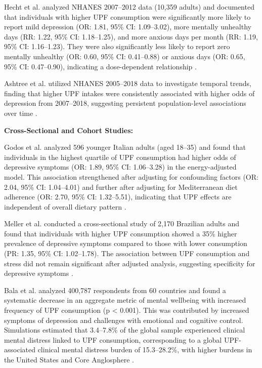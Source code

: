 \documentclass[journal,twoside,10pt]{IEEEtran}
\begin{document}
Hecht et al. \cite{ref20} analyzed NHANES 2007--2012 data (10,359 adults) and documented that individuals with higher UPF consumption were significantly more likely to report mild depression (OR: 1.81, 95\% CI: 1.09--3.02), more mentally unhealthy days (RR: 1.22, 95\% CI: 1.18--1.25), and more anxious days per month (RR: 1.19, 95\% CI: 1.16--1.23). They were also significantly less likely to report zero mentally unhealthy (OR: 0.60, 95\% CI: 0.41--0.88) or anxious days (OR: 0.65, 95\% CI: 0.47--0.90), indicating a dose-dependent relationship \cite{ref20}.

Ashtree et al. \cite{ref26} utilized NHANES 2005--2018 data to investigate temporal trends, finding that higher UPF intakes were consistently associated with higher odds of depression from 2007--2018, suggesting persistent population-level associations over time \cite{ref26}.

\textbf{Cross-Sectional and Cohort Studies:}

Godos et al. \cite{ref14} analyzed 596 younger Italian adults (aged 18--35) and found that individuals in the highest quartile of UPF consumption had higher odds of depressive symptoms (OR: 1.89, 95\% CI: 1.06--3.28) in the energy-adjusted model. This association strengthened after adjusting for confounding factors (OR: 2.04, 95\% CI: 1.04--4.01) and further after adjusting for Mediterranean diet adherence (OR: 2.70, 95\% CI: 1.32--5.51), indicating that UPF effects are independent of overall dietary pattern \cite{ref14}.

Meller et al. \cite{ref25} conducted a cross-sectional study of 2,170 Brazilian adults and found that individuals with higher UPF consumption showed a 35\% higher prevalence of depressive symptoms compared to those with lower consumption (PR: 1.35, 95\% CI: 1.02--1.78). The association between UPF consumption and stress did not remain significant after adjusted analysis, suggesting specificity for depressive symptoms \cite{ref25}.

Bala et al. \cite{ref12} analyzed 400,787 respondents from 60 countries and found a systematic decrease in an aggregate metric of mental wellbeing with increased frequency of UPF consumption (p < 0.001). This was contributed by increased symptoms of depression and challenges with emotional and cognitive control. Simulations estimated that 3.4--7.8\% of the global sample experienced clinical mental distress linked to UPF consumption, corresponding to a global UPF-associated clinical mental distress burden of 15.3--28.2\%, with higher burdens in the United States and Core Anglosphere \cite{ref12}.
\end{document}
